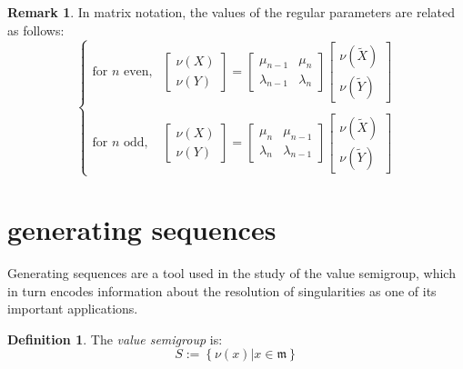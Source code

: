 \documentclass[11pt]{amsart}
\theoremstyle{definition}
\newtheorem*{defin}{Definition}
\newtheorem*{rem}{Remark}
\begin{document}
{\begin{rem}In matrix notation, the values of the regular parameters are related as follows:
\begin{equation}\label{matrixvalues}
\left\{
\begin{array}{llll}
\text{for } n \text{ even,} &
\left[\begin{array}{l} \nu(X) \\ \nu(Y) \end{array}\right] =
\left[\begin{array}{ll} \mu_{n-1} & \mu_n \\ \lambda_{n-1} & \lambda_n \end{array}\right]
\left[\begin{array}{l} \nu(\tilde X) \\ \nu(\tilde Y) \end{array}\right]
\\\\
\text{for } n \text{ odd,} &
\left[\begin{array}{l} \nu(X) \\ \nu(Y) \end{array}\right] =
\left[\begin{array}{ll} \mu_n & \mu_{n-1} \\ \lambda_n & \lambda_{n-1} \end{array}\right]
\left[\begin{array}{l} \nu(\tilde X) \\ \nu(\tilde Y) \end{array}\right]
\end{array}
\right.
\end{equation}
\end{rem}




\section{generating sequences} \label{sectgs}

Generating sequences are a tool used in the study of the value semigroup, which in turn encodes information about the resolution of singularities as one of its important applications.

\begin{defin}
The {\it value semigroup} is:
\begin{equation*}
S:=\left\{\nu(x) \left.|\right. x\in \mathfrak{m} \right\}
\end{equation*}
\end{defin}

}
\end{document}
